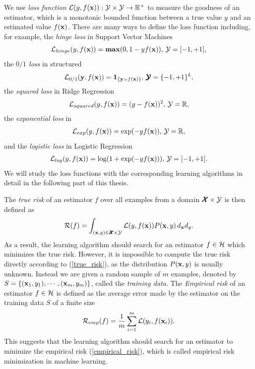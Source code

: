 We use \textit{loss function} $\mathcal{L}(y,f(\mathbf {x})):\mathcal{Y}\times\mathcal{Y}\rightarrow\mathbb{R}^+$ to measure the goodness of an estimator, which is a monotonic bounded function between a true value $y$ and an estimated value $f(\mathbf {x})$.
There are many ways to define the loss function including, for example,
the \textit{hinge loss} in Support Vector Machines \citep{Cortes95support}
\begin{align}
	\mathcal{L}_{hinge}(y,f(\mathbf {x})) = \textbf{max} (0,1-y f(\mathbf {x})),\, \mathcal{Y}=[-1,+1], \label{hinge_loss}
\end{align}
the \textit{$0/1$ loss} in structured \svm\ \citep{THJA04}
\begin{align}
	\mathcal{L}_{0/1}(\mathbf {y},f(\mathbf {x})) = \mathbf{1}_{\{\mathbf {y}=f(\mathbf {x})\}},\, \pmb {\mathcal{Y}} = \{-1,+1\}^k, \label{one_loss}
\end{align}
the \textit{squared loss} in Ridge Regression \citep{Hoerl00ridge}
\begin{align*}
	\mathcal{L}_{squared}(y,f(\mathbf {x})) = (y-f(\mathbf {x}))^2,\, \mathcal{Y}=\mathbb{R},
\end{align*}
the \textit{exponential loss} in \adaboost\ \citep{Schapire99improved}
\begin{align}
	\mathcal{L}_{exp}(y,f(\mathbf {x})) = \exp(-y f(\mathbf {x})),\, \mathcal{Y}=\mathbb{R}, \label{exp_loss}
\end{align}
and the \textit{logistic loss} in Logistic Regression \citep{Chen99}
\begin{align}
	\mathcal{L}_{log}(y,f(\mathbf {x})) = \log(1+\exp(-y f(\mathbf {x}))),\, \mathcal{Y}=[-1,+1]. \label{log_loss}
\end{align}
We will study the loss functions with the corresponding learning algorithms in detail in the following part of this thesis.

The \textit{true risk} of an estimator $f$ over all examples from a domain $\pmb {\mathcal{X}}\times\mathcal{Y}$ is then defined as
\begin{align}
	\mathcal{R}(f) = \int_{(\mathbf {x},y)\in\pmb {\mathcal{X}}\times\mathcal{Y}}\mathcal{L}(y,f(\mathbf {x}))P(\mathbf {x},y)\,d_{\mathbf {x}}d_{y} \label{true_risk}.
\end{align}
As a result, the learning algorithm should search for an estimator $f\in\mathcal{H}$ which minimizes the true risk.
However, it is impossible to compute the true risk directly according to (\ref{true_risk}), as the distribution $P(\mathbf {x},y)$ is usually unknown.
Instead we are given a random sample of $m$ examples, denoted by $S=\{(\mathbf {x}_1,y_1),\cdots,(\mathbf {x}_m,y_m)\}$, called the \textit{training data}.
The \textit{Empirical risk} of an estimator $f\in\mathcal{H}$ is defined as the average error made by the estimator on the training data $S$ of a finite size
\begin{align}
	\mathcal{R}_{emp}(f) = \frac{1}{m}\sum_{i=1}^{m}\mathcal{L}(y_i,f(\mathbf {x}_i)) \label{empirical_risk}.
\end{align}
This suggests that the learning algorithm should search for an estimator to minimize the empirical risk (\ref{empirical_risk}), which is called {empirical risk minimization} \citep{Vapnik92principles} in machine learning.

